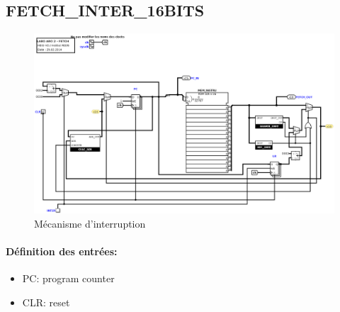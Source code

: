 \documentclass[a4paper]{article} %
\begin{document}
\subsection{FETCH\_INTER\_16BITS}
\begin{figure}[H]
    \centering
    \includegraphics[width=1\textwidth]{src/FETCH_INTER.png}
    \caption{Mécanisme d'interruption}
    \label{fetch_inter}
\end{figure}

\paragraph{Définition des entrées:}
\begin{itemize}
    \item     PC: program counter
    \item     CLR: reset
\end{itemize}
\end{document}
